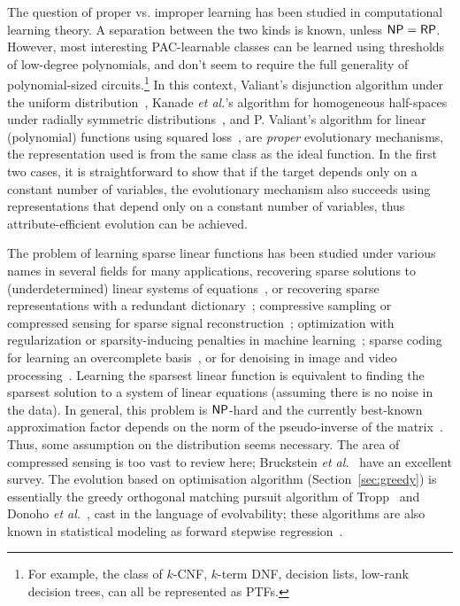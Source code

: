 The question of proper vs. improper learning has been studied in computational
learning theory. A separation between the two kinds is known, unless $\mathsf{NP} =
\mathsf{RP}$. However, most interesting PAC-learnable classes can be learned using
thresholds of low-degree polynomials, and don't seem to require the full
generality of polynomial-sized circuits.\footnote{For example, the class of
$k$-CNF, $k$-term DNF, decision lists, low-rank decision trees, can all be
represented as PTFs.} In this context, Valiant's disjunction algorithm under the
uniform distribution~\cite{Valiant:2009-evolvability}, Kanade {\it et al.}'s algorithm
for homogeneous half-spaces under radially symmetric
distributions~\cite{KVV:2010-drift}, and P. Valiant's algorithm for linear
(polynomial) functions using squared loss~\cite{Valiant:2012-real}, are
\emph{proper} evolutionary mechanisms, \ie the representation used is from the
same class as the ideal function.  In the first two cases, it is straightforward
to show that if the target depends only on a constant number of variables, the
evolutionary mechanism also succeeds using representations that depend only on a
constant number of variables, thus attribute-efficient evolution can be
achieved.


The problem of learning sparse linear functions has been studied under various
names in several fields for many applications, \eg recovering sparse solutions
to (underdetermined) linear systems of equations~\cite{Donoho:2009-sparse}, or
recovering sparse representations with a redundant
dictionary~\cite{Mallat:2008,Elad:2010}; compressive sampling or compressed
sensing for sparse signal reconstruction~\cite{Candes:2008}; optimization with
regularization or sparsity-inducing penalties in machine
learning~\cite{Bach:2012}; sparse coding for learning an overcomplete
basis~\cite{Olshausen:1997}, or for denoising in image and video
processing~\cite{Elad:2010}. Learning the sparsest linear function is equivalent
to finding the sparsest solution to a system of linear equations (assuming there
is no noise in the data). In general, this problem is $\mathsf{NP}$-hard and the
currently best-known approximation factor depends on the norm of the
pseudo-inverse of the matrix~\cite{Natarajan:1995}.  Thus, some assumption on
the distribution seems necessary. The area of compressed sensing is too vast to
review here; Bruckstein \emph{et al.}~\cite{Donoho:2009-sparse} have an
excellent survey.  The evolution based on optimisation algorithm
(Section~\ref{sec:greedy}) is essentially the greedy orthogonal matching pursuit
algorithm of Tropp~\cite{Tropp:2004-greed} and Donoho \emph{et
al.}~\cite{Donoho:2006-recovery}, cast in the language of evolvability; these
algorithms are also known in statistical modeling as forward stepwise
regression~\cite{Daniel:1999,Hastie:2001}.


